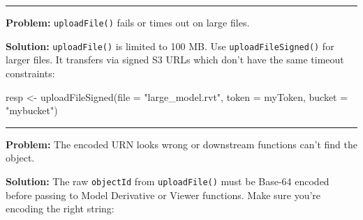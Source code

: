 \documentclass[
  11pt,
  letterpaper,
  DIV=11,
  numbers=noendperiod]{scrreprt}
\newenvironment{Shaded}{\begin{snugshade}}{\end{snugshade}}
\newcommand{\AttributeTok}[1]{\textcolor[rgb]{0.40,0.45,0.13}{#1}}
\newcommand{\CommentTok}[1]{\textcolor[rgb]{0.37,0.37,0.37}{#1}}
\newcommand{\ControlFlowTok}[1]{\textcolor[rgb]{0.00,0.23,0.31}{\textbf{#1}}}
\newcommand{\FunctionTok}[1]{\textcolor[rgb]{0.28,0.35,0.67}{#1}}
\newcommand{\NormalTok}[1]{\textcolor[rgb]{0.00,0.23,0.31}{#1}}
\newcommand{\OtherTok}[1]{\textcolor[rgb]{0.00,0.23,0.31}{#1}}
\newcommand{\SpecialCharTok}[1]{\textcolor[rgb]{0.37,0.37,0.37}{#1}}
\newcommand{\StringTok}[1]{\textcolor[rgb]{0.13,0.47,0.30}{#1}}
\begin{document}
\begin{Shaded}
\end{Shaded}

\begin{center}\rule{0.5\linewidth}{0.5pt}\end{center}

\textbf{Problem:} \texttt{uploadFile()} fails or times out on large
files.

\textbf{Solution:} \texttt{uploadFile()} is limited to 100 MB. Use
\texttt{uploadFileSigned()} for larger files. It transfers via signed S3
URLs which don't have the same timeout constraints:

\begin{Shaded}
\begin{Highlighting}[]
\NormalTok{resp }\OtherTok{\textless{}{-}} \FunctionTok{uploadFileSigned}\NormalTok{(}\AttributeTok{file =} \StringTok{"large\_model.rvt"}\NormalTok{, }\AttributeTok{token =}\NormalTok{ myToken, }\AttributeTok{bucket =} \StringTok{"mybucket"}\NormalTok{)}
\end{Highlighting}
\end{Shaded}

\begin{center}\rule{0.5\linewidth}{0.5pt}\end{center}

\textbf{Problem:} The encoded URN looks wrong or downstream functions
can't find the object.

\textbf{Solution:} The raw \texttt{objectId} from \texttt{uploadFile()}
must be Base-64 encoded before passing to Model Derivative or Viewer
functions. Make sure you're encoding the right string:
\end{document}
